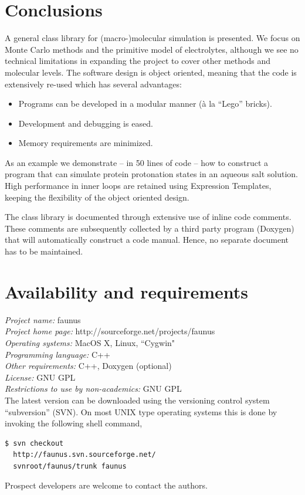 \documentclass[10pt]{bmc_article}
\newenvironment{bmcformat}{\begin{raggedright}\baselineskip20pt\sloppy\setboolean{publ}{false}}{\end{raggedright}\baselineskip20pt\sloppy}
\begin{document}
\begin{bmcformat}
\section*{Conclusions}
A general class library for (macro-)molecular simulation is presented.
We focus on Monte Carlo methods and the primitive model of electrolytes, although we see no technical limitations in expanding the project to cover other methods and molecular levels.
The software design is object oriented, meaning that the code is extensively re-used which has several advantages:
\begin{itemize}
\item Programs can be developed in a modular manner (\`a la ``Lego'' bricks).
\item Development and debugging is eased.
\item Memory requirements are minimized.
\end{itemize}
As an example we demonstrate -- in 50 lines of code -- how to construct a program that can simulate protein protonation states in an aqueous salt solution.
High performance in inner loops are retained using Expression Templates, keeping the flexibility of the object oriented design.

The class library is documented through extensive use of inline code comments.
These comments are subsequently collected by a third party program (Doxygen) that will automatically construct a code manual. Hence, no separate document has to be maintained.

\section*{Availability and requirements}
\textsl{Project name:} faunus\\
\textsl{Project home page:} http://sourceforge.net/projects/faunus\\
\textsl{Operating systems:} MacOS X, Linux, ``Cygwin"\\
\textsl{Programming language:} C++\\
\textsl{Other requirements:} C++, Doxygen (optional)\\
\textsl{License:} GNU GPL\\
\textsl{Restrictions to use by non-academics:} GNU GPL\\

The latest version can be downloaded using the versioning control system ``subversion'' (SVN).
On most UNIX type operating systems this is done by invoking the following shell command,
\begin{verbatim}
$ svn checkout
  http://faunus.svn.sourceforge.net/
  svnroot/faunus/trunk faunus
\end{verbatim}
Prospect developers are welcome to contact the authors.



\end{bmcformat}
\end{document}
